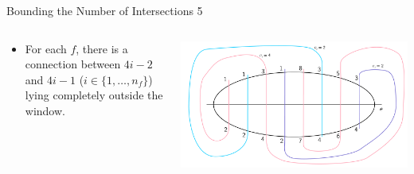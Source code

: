 \documentclass[10pt,aspectratio=169]{beamer}
\theoremstyle{plain}
\newcommand{\set}[1]{\{#1\}}
\begin{document}
\begin{frame}{Bounding the Number of Intersections 5}
    \begin{columns}
    \begin{column}{0.35\textwidth}
        \begin{itemize}
            \item For each \(f\), there is a connection between \(4i-2\) and \(4i-1\) (\(i \in \set{1,\ldots, n_f}\)) lying completely outside the window.
        \end{itemize}
    \end{column}
    \begin{column}{0.65\textwidth}
        \begin{center}
            \includegraphics[width=\textwidth]{images/figure-6.pdf}
        \end{center}
    \end{column}
    \end{columns}
\end{frame}
\end{document}
